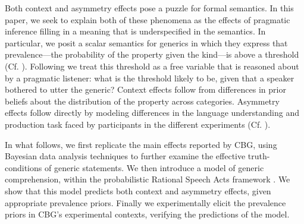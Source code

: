 \documentclass[10pt,letterpaper]{article}
\begin{document}
Both context and asymmetry effects pose a puzzle for formal semantics. 
In this paper, we seek to explain both of these phenomena as the effects of pragmatic inference filling in a meaning that is underspecified in the semantics. 
In particular, we posit a scalar semantics for generics in which they express that prevalence---the probability of the property given the kind---is above a threshold (Cf. \cite{cohen}). Following  we treat this threshold as a free variable that is reasoned about by a pragmatic listener: what is the threshold likely to be, given that a speaker bothered to utter the generic? Context effects follow from differences in prior beliefs about the distribution of the property across categories. Asymmetry effects follow directly by modeling differences in the language understanding and production task faced by participants in the different experiments (Cf. ).  %


In what follows, we first replicate the main effects reported by CBG, using Bayesian data analysis techniques to further examine the effective truth-conditions of generic statements. We then introduce a model of generic comprehension, within the probabilistic Rational Speech Acts framework \cite{Frank2012,Goodman2013}. We show that this model predicts both context and asymmetry effects, given appropriate prevalence priors. Finally we experimentally elicit the prevalence priors in CBG's experimental contexts, verifying the predictions of the model.



\end{document}
